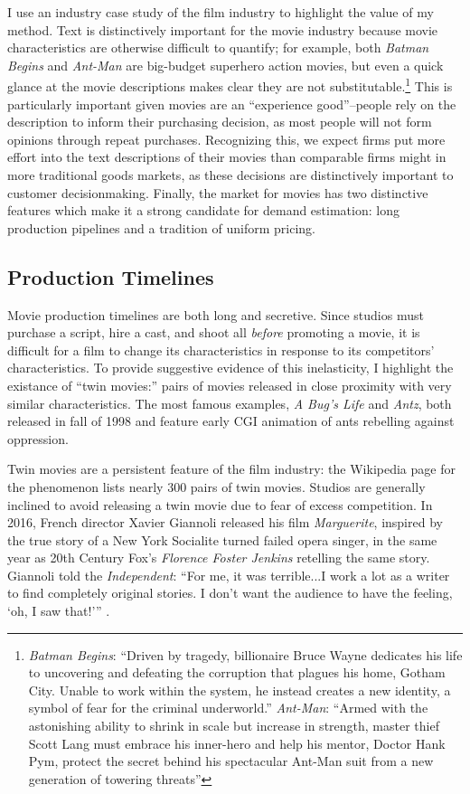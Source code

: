 \documentclass{article}
\begin{document}
I use an industry case study of the film industry to highlight the value of my method. Text is distinctively important for the movie industry because movie characteristics are otherwise difficult to quantify; for example, both \emph{Batman Begins} and \emph{Ant-Man} are big-budget superhero action movies, but even a quick glance at the movie descriptions makes clear they are not substitutable.\footnote{\emph{Batman Begins}: ``Driven by tragedy, billionaire Bruce Wayne dedicates his life to uncovering and defeating the corruption that plagues his home, Gotham City. Unable to work within the system, he instead creates a new identity, a symbol of fear for the criminal underworld.'' \emph{Ant-Man}: ``Armed with the astonishing ability to shrink in scale but increase in strength, master thief Scott Lang must embrace his inner-hero and help his mentor, Doctor Hank Pym, protect the secret behind his spectacular Ant-Man suit from a new generation of towering threats''} This is particularly important given movies are an ``experience good''--people rely on the description to inform their purchasing decision, as most people will not form opinions through repeat purchases. Recognizing this, we expect firms put more effort into the text descriptions of their movies than comparable firms might in more traditional goods markets, as these decisions are distinctively important to customer decisionmaking. Finally, the market for movies has two distinctive features which make it a strong candidate for demand estimation: long production pipelines and a tradition of uniform pricing.

\subsection{Production Timelines}

Movie production timelines are both long and secretive. Since studios must purchase a script, hire a cast, and shoot all \emph{before} promoting a movie, it is difficult for a film to change its characteristics in response to its competitors' characteristics. To provide suggestive evidence of this inelasticity, I highlight the existance of ``twin movies:'' pairs of movies released in close proximity with very similar characteristics. The most famous examples, \emph{A Bug's Life} and \emph{Antz}, both released in fall of 1998 and feature early CGI animation of ants rebelling against oppression.

Twin movies are a persistent feature of the film industry: the Wikipedia page for the phenomenon lists nearly 300 pairs of twin movies. Studios are generally inclined to avoid releasing a twin movie due to fear of excess competition. In 2016, French director Xavier Giannoli released his film \emph{Marguerite}, inspired by the true story of a New York Socialite turned failed opera singer, in the same year as 20th Century Fox's \emph{Florence Foster Jenkins} retelling the same story. Giannoli told the \emph{Independent}: ``For me, it was terrible...I work a lot as a writer to find completely original stories. I don't want the audience to have the feeling, `oh, I saw that!''' \parencite{mottram2016I}.
\end{document}
